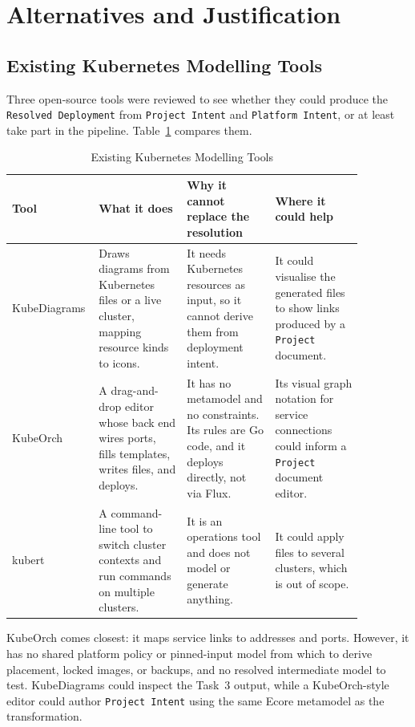 \section{Alternatives and Justification}
\label{sec:alternatives}

\subsection{Existing Kubernetes Modelling Tools}
\label{sec:existingtools}

Three open-source tools were reviewed to see whether they could produce the
\texttt{Resolved Deployment} from \texttt{Project Intent} and
\texttt{Platform Intent}, or at least take part in the pipeline.
Table~\ref{tab:tools} compares them.

\begin{table}[H]
\centering
\begin{tabular}{>{\raggedright\arraybackslash}p{0.15\linewidth}>{\raggedright\arraybackslash}p{0.24\linewidth}>{\raggedright\arraybackslash}p{0.24\linewidth}>{\raggedright\arraybackslash}p{0.24\linewidth}}
\hline
\textbf{Tool} & \textbf{What it does} & \textbf{Why it cannot replace the resolution} & \textbf{Where it could help} \\
\hline
KubeDiagrams \cite{kubediagrams} &
  Draws diagrams from Kubernetes files or a live cluster, mapping resource kinds to icons. &
  It needs Kubernetes resources as input, so it cannot derive them from deployment intent. &
  It could visualise the generated files to show links produced by a \texttt{Project} document. \\
KubeOrch \cite{kubeorch} &
  A drag-and-drop editor whose back end wires ports, fills templates, writes files, and deploys. &
  It has no metamodel and no constraints. Its rules are Go code, and it deploys directly, not via Flux. &
  Its visual graph notation for service connections could inform a \texttt{Project} document editor. \\
kubert \cite{kubert} &
  A command-line tool to switch cluster contexts and run commands on multiple clusters. &
  It is an operations tool and does not model or generate anything. &
  It could apply files to several clusters, which is out of scope. \\
\hline
\end{tabular}
\caption{Existing Kubernetes Modelling Tools}
\label{tab:tools}
\end{table}

KubeOrch comes closest: it maps service links to addresses and ports.
However, it has no shared platform policy or pinned-input model from which
to derive placement, locked images, or backups, and no resolved intermediate
model to test. KubeDiagrams could inspect the Task~3 output, while a
KubeOrch-style editor could author \texttt{Project Intent} using the same
Ecore metamodel as the transformation.

